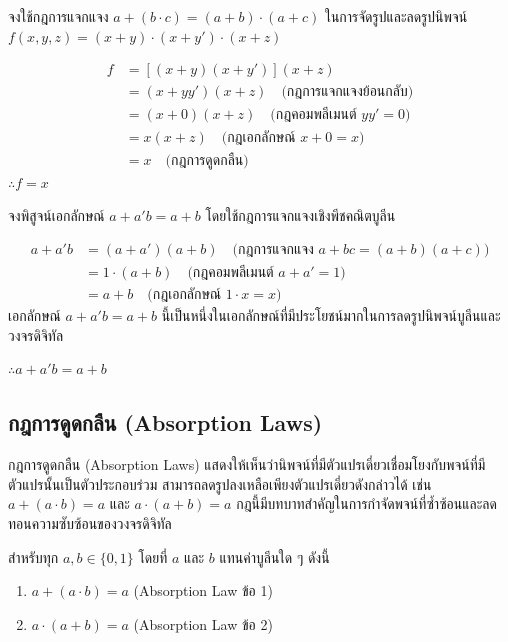\begin{ex}
\label{ex:distributive-simplify}
จงใช้กฎการแจกแจง $a + (b \cdot c) = (a + b) \cdot (a + c)$ ในการจัดรูปและลดรูปนิพจน์ $f(x, y, z) = (x + y) \cdot (x + y') \cdot (x + z)$
\end{ex}
\begin{solution}
\begin{align*}
f &= [(x + y)(x + y')](x + z) \\
  &= (x + y y')(x + z) \quad \text{(กฎการแจกแจงย้อนกลับ)} \\
  &= (x + 0)(x + z) \quad \text{(กฎคอมพลีเมนต์ } y y' = 0\text{)} \\
  &= x(x + z) \quad \text{(กฎเอกลักษณ์ } x + 0 = x\text{)} \\
  &= x \quad \text{(กฎการดูดกลืน)}
\end{align*}
$\therefore f = x$ \solhere
\end{solution}

\begin{ex}
\label{ex:prove-absorption-variant}
จงพิสูจน์เอกลักษณ์ $a + a'b = a + b$ โดยใช้กฎการแจกแจงเชิงพีชคณิตบูลีน
\end{ex}
\begin{solution}
\begin{align*}
a + a'b &= (a + a')(a + b) \quad \text{(กฎการแจกแจง } a + bc = (a+b)(a+c)\text{)} \\
        &= 1 \cdot (a + b) \quad \text{(กฎคอมพลีเมนต์ } a + a' = 1\text{)} \\
        &= a + b \quad \text{(กฎเอกลักษณ์ } 1 \cdot x = x\text{)}
\end{align*}
เอกลักษณ์ $a + a'b = a + b$ นี้เป็นหนึ่งในเอกลักษณ์ที่มีประโยชน์มากในการลดรูปนิพจน์บูลีนและวงจรดิจิทัล

$\therefore a + a'b = a + b$ \solhere
\end{solution}

\subsection{กฎการดูดกลืน (Absorption Laws)}
กฎการดูดกลืน (Absorption Laws) แสดงให้เห็นว่านิพจน์ที่มีตัวแปรเดี่ยวเชื่อมโยงกับพจน์ที่มีตัวแปรนั้นเป็นตัวประกอบร่วม สามารถลดรูปลงเหลือเพียงตัวแปรเดี่ยวดังกล่าวได้ เช่น $a + (a \cdot b) = a$ และ $a \cdot (a + b) = a$ กฎนี้มีบทบาทสำคัญในการกำจัดพจน์ที่ซ้ำซ้อนและลดทอนความซับซ้อนของวงจรดิจิทัล~\parencite{rosen2019discrete}

\begin{law}
สำหรับทุก $a, b \in \{0, 1\}$ โดยที่ $a$ และ $b$ แทนค่าบูลีนใด ๆ ดังนี้

\begin{enumerate}
    \item $a + (a \cdot b) = a$ \hfill (Absorption Law ข้อ 1)
    \item $a \cdot (a + b) = a$ \hfill (Absorption Law ข้อ 2)
\end{enumerate}
\end{law}

